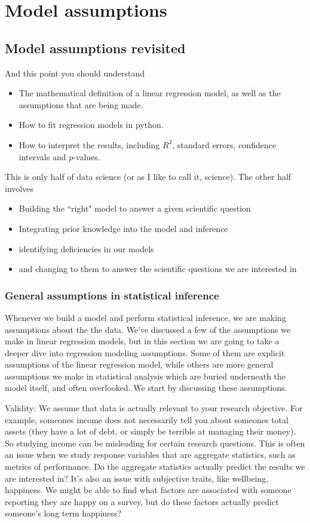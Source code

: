 \chapter{Model assumptions}

\section{Model assumptions revisited}

And this point you should understand 
\begin{itemize}
\item The mathematical definition of a linear regression model, as well as the assumptions that are being made. 
\item How to fit regression models in python.
\item How to interpret the results, including $R^2$, standard errors, confidence intervals and $p$-values. 
\end{itemize}
This is only half of data science (or as I like to call it, science). The other half involves 
\begin{itemize}
\item Building the ``right" model to answer a given scientific question 
\item Integrating prior knowledge into the model and inference  
\item identifying deficiencies in our models 
\item and changing to them to answer the scientific questions we are interested in
\end{itemize}


\subsection{General assumptions in statistical inference}

Whenever we build a model and perform statistical inference, we are making assumptions about the the data. We've discussed a few of the assumptions we make in linear regression models, but in this section we are going to take a deeper dive into regression modeling assumptions. Some of them are explicit assumptions of the linear regression model, while others are more general assumptions we make in statistical analysis which are buried underneath the model itself, and often overlooked. We start by discussing these assumptions. 

{\dfn Validity}:
We assume that data is actually relevant to your research objective. For example, someones income does not necessarily tell you about someones total assets (they have a lot of debt, or simply be terrible at managing their money). So studying income can be misleading for certain research questions. 
This is often an issue when we study response variables that are aggregate statistics, such as metrics of performance. Do the aggregate statistics actually predict the results we are interested in? It's also an issue with subjective traits, like wellbeing, happiness. We might be able to find what factors are associated with someone reporting they are happy on a survey, but do these factors actually predict someone's long term happiness?

